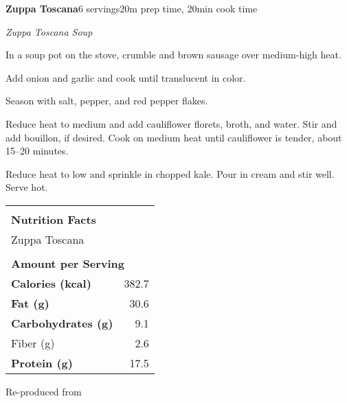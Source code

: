 \documentclass[../recipe-collections/cooking.tex]{subfiles}
\begin{document}
\begin{recipe}{\textbf{Zuppa Toscana}}{6 servings}{20m prep time, 20min cook time}
  
  \freeform{}\textit{Zuppa Toscana Soup}

  
  In a soup pot on the stove, crumble and brown sausage over medium-high heat.

  
  Add onion and garlic and cook until translucent in color. 
  
  
  Season with salt, pepper, and red pepper flakes. 
  
  
  Reduce heat to medium and add cauliflower florets, broth, and water. 
  Stir and add bouillon, if desired. Cook on medium heat until 
  cauliflower is tender, about 15--20 minutes. 
  

  Reduce heat to low and sprinkle in chopped kale. Pour in cream and stir well. Serve hot.
  
  \bigskip
  \centering
  \begin{tabular}{|lr|}
    \hline
                                        &                                       \\
    \multicolumn{2}{|l|}{\huge{\textbf{\textrm{Nutrition Facts}}}}              \\
    \multicolumn{2}{|l|}{\textrm{Zuppa Toscana}}                               \\ 
                                        &                                       \\
    \multicolumn{2}{|l|}{\footnotesize{\textbf{\textrm{Amount per Serving}}}}   \\ \hline
    \textbf{\textrm{Calories (kcal)}}   & \textrm{382.7}                          \\ \hline
    \textbf{\textrm{Fat (g)}}           & \textrm{30.6}                           \\ \hline
    \textbf{\textrm{Carbohydrates (g)}} & \textrm{9.1}                            \\ \hline
    \hspace{2mm} \textrm{Fiber (g)}     & \textrm{2.6}                            \\ \hline
    \textbf{\textrm{Protein (g)}}       & \textrm{17.5}                            \\ \hline
  \end{tabular}

  \freeform{}\hrulefill{}

\end{recipe}

Re-produced from  \autocite{lina_2020}

  
\end{document}
